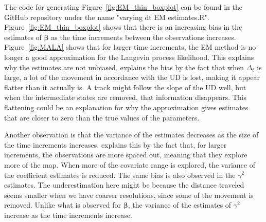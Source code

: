 The code for generating Figure~\ref{fig:EM_thin_boxplot} can be found in the GitHub repository under the name "varying dt EM estimates.R". Figure~\ref{fig:EM_thin_boxplot} shows that there is an increasing bias in the estimates of $\bm \beta$ as the time increments between the observations increases. Figure~\ref{fig:MALA} shows that for larger time increments, the EM method is no longer a good approximation for the Langevin process likelihood. This explains why the estimates are not unbiased. \textcite{michelot_langevin_2019} explains the bias by the fact that when $\Delta_t$ is large, a lot of the movement in accordance with the UD is lost, making it appear flatter than it actually is. A track might follow the slope of the UD well, but when the intermediate states are removed, that information disappears. This flattening could be an explanation for why the approximation gives estimates that are closer to zero than the true values of the parameters. 


Another observation is that the variance of the estimates decreases as the size of the time increments increases. \parencite{michelot_langevin_2019} explains this by the fact that, for larger increments, the observations are more spaced out, meaning that they explore more of the map. When more of the covariate range is explored, the variance of the coefficient estimates is reduced. The same bias is also observed in the $\gamma^2$ estimates. The underestimation here might be because the distance traveled seems smaller when we have coarser resolutions, since some of the movement is removed. Unlike what is observed for $\bm \beta$, the variance of the estimates of $\gamma^2$ increase as the time increments increase.


